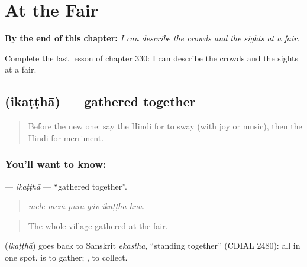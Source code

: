 
\chapter{At the Fair}
\label{ch:hi-at-the-fair}

\begin{chapteropening}
\textbf{By the end of this chapter:} \emph{I can describe the crowds and the sights at a fair.}

Complete the last lesson of chapter 330: I can describe the crowds and the sights at a fair.
\end{chapteropening}

\section[\texorpdfstring{\hi{इकट्ठा} (ikaṭṭhā)}{इकट्ठा (ikaṭṭhā)}]{ (ikaṭṭhā) — gathered together}

\label{lesson:HI-C330-ikattha}



\begin{quote}
Before the new one: say the Hindi for to sway (with joy or music), then the Hindi for merriment.
\end{quote}

\subsection*{You'll want to know: }
\textbf{} — \emph{ikaṭṭhā} — \textquotedblleft{}gathered together\textquotedblright{}.

\begin{quote}
     
\end{quote}

\begin{quote}
\emph{mele meṁ pūrā gā̃v ikaṭṭhā huā.}
\end{quote}

\begin{quote}
The whole village gathered at the fair.
\end{quote}

\begin{cousinweb}
\textbf{} (\emph{ikaṭṭhā}) goes back to Sanskrit \emph{ekastha}, \textquotedblleft{}standing together\textquotedblright{} (CDIAL 2480): all in one spot. \textbf{ } is to gather; \textbf{ }, to collect.
\end{cousinweb}

